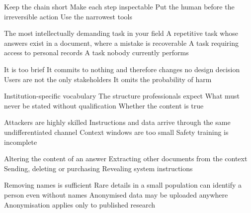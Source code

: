\documentclass[11pt,a4paper]{article}
\begin{document}
\begin{questions}
  {Keep the chain short}
  {Make each step inspectable}
  {Put the human before the irreversible action}
  {Use the narrowest tools}

  {The most intellectually demanding task in your field}
  {A repetitive task whose answers exist in a document, where a mistake is recoverable}
  {A task requiring access to personal records}
  {A task nobody currently performs}

  {It is too brief}
  {It commits to nothing and therefore changes no design decision}
  {Users are not the only stakeholders}
  {It omits the probability of harm}

  {Institution-specific vocabulary}
  {The structure professionals expect}
  {What must never be stated without qualification}
  {Whether the content is true}

  {Attackers are highly skilled}
  {Instructions and data arrive through the same undifferentiated channel}
  {Context windows are too small}
  {Safety training is incomplete}

  {Altering the content of an answer}
  {Extracting other documents from the context}
  {Sending, deleting or purchasing}
  {Revealing system instructions}

  {Removing names is sufficient}
  {Rare details in a small population can identify a person even without names}
  {Anonymised data may be uploaded anywhere}
  {Anonymisation applies only to published research}

\end{questions}
\end{document}
